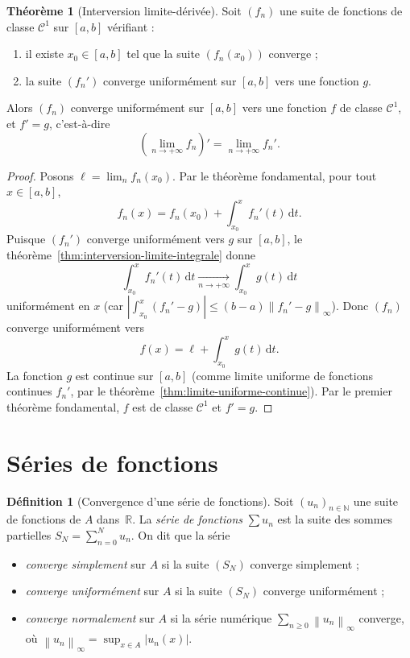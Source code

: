 \documentclass[12pt,a4paper,openany]{book}
\theoremstyle{definition}
\newtheorem{definition}{Définition}[chapter]
\newtheorem{theoreme}{Théorème}[chapter]
\newcommand{\N}{\mathbb{N}}
\newcommand{\R}{\mathbb{R}}
\newcommand{\abs}[1]{\left\lvert #1 \right\rvert}
\newcommand{\norm}[1]{\left\lVert #1 \right\rVert}
\newcommand{\dd}{\mathrm{d}}
\begin{document}
\begin{theoreme}[Interversion limite-dérivée]\label{thm:interversion-limite-derivee}
  Soit $(f_n)$ une suite de fonctions de classe $\mathcal{C}^1$ sur $[a,b]$ vérifiant :
  \begin{enumerate}[label=(\roman*)]
    \item il existe $x_0 \in [a,b]$ tel que la suite $(f_n(x_0))$ converge ;
    \item la suite $(f_n')$ converge uniformément sur $[a,b]$ vers une fonction $g$.
  \end{enumerate}
  Alors $(f_n)$ converge uniformément sur $[a,b]$ vers une fonction $f$ de classe $\mathcal{C}^1$, et $f' = g$, c'est-à-dire
  \[
    \left(\lim_{n \to +\infty} f_n\right)' = \lim_{n \to +\infty} f_n'.
  \]
\end{theoreme}

\begin{proof}
  Posons $\ell = \lim_{n} f_n(x_0)$. Par le théorème fondamental, pour tout $x \in [a,b]$,
  \[
    f_n(x) = f_n(x_0) + \int_{x_0}^x f_n'(t)\,\dd t.
  \]
  Puisque $(f_n')$ converge uniformément vers $g$ sur $[a,b]$, le théorème~\ref{thm:interversion-limite-integrale} donne
  \[
    \int_{x_0}^x f_n'(t)\,\dd t \xrightarrow[n \to +\infty]{} \int_{x_0}^x g(t)\,\dd t
  \]
  uniformément en $x$ (car $\abs{\int_{x_0}^x (f_n' - g)} \leqslant (b-a)\norm{f_n'-g}_\infty$). Donc $(f_n)$ converge uniformément vers
  \[
    f(x) = \ell + \int_{x_0}^x g(t)\,\dd t.
  \]
  La fonction $g$ est continue sur $[a,b]$ (comme limite uniforme de fonctions continues $f_n'$, par le théorème~\ref{thm:limite-uniforme-continue}). Par le premier théorème fondamental, $f$ est de classe $\mathcal{C}^1$ et $f' = g$.
\end{proof}

\section{Séries de fonctions}
\label{sec:series-fonctions}

\begin{definition}[Convergence d'une série de fonctions]\label{def:convergence-serie-fonctions}
  Soit $(u_n)_{n \in \N}$ une suite de fonctions de $A$ dans~$\R$. La \emph{série de fonctions} $\sum u_n$ est la suite des sommes partielles $S_N = \sum_{n=0}^{N} u_n$. On dit que la série
  \begin{itemize}[nosep]
    \item \emph{converge simplement} sur $A$ si la suite $(S_N)$ converge simplement ;
    \item \emph{converge uniformément} sur $A$ si la suite $(S_N)$ converge uniformément ;
    \item \emph{converge normalement} sur $A$ si la série numérique $\sum_{n \geqslant 0} \norm{u_n}_\infty$ converge, où $\norm{u_n}_\infty = \sup_{x \in A}\abs{u_n(x)}$.
  \end{itemize}
\end{definition}
\end{document}
